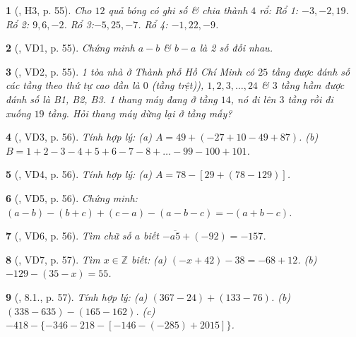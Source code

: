 \documentclass{article}
\newtheorem{baitoan}{}
\begin{document}
\begin{baitoan}[\cite{Binh_boi_duong_Toan_6_tap_1}, H3, p. 55]
	Cho $12$ quả bóng có ghi số \& chia thành $4$ rổ: Rổ 1: $-3,-2,19$. Rổ 2: $9,6,-2$. Rổ 3:$-5,25,-7$. Rổ 4: $-1,22,-9$.
\end{baitoan}

\begin{baitoan}[\cite{Binh_boi_duong_Toan_6_tap_1}, VD1, p. 55]
	Chứng minh $a - b$ \& $b - a$ là 2 số đối nhau.
\end{baitoan}

\begin{baitoan}[\cite{Binh_boi_duong_Toan_6_tap_1}, VD2, p. 55]
	1 tòa nhà ở Thành phố Hồ Chí Minh có $25$ tầng được đánh số các tầng theo thứ tự cao dần là $0$ (tầng trệt)), $1,2,3,\ldots,24$ \& $3$ tầng hầm được đánh số là B1, B2, B3. 1 thang máy đang ở tầng $14$, nó đi lên $3$ tầng rồi đi xuống $19$ tầng. Hỏi thang máy dừng lại ở tầng mấy?
\end{baitoan}

\begin{baitoan}[\cite{Binh_boi_duong_Toan_6_tap_1}, VD3, p. 56]
	Tính hợp lý: (a) $A = 49 + (-27 + 10 - 49 + 87)$. (b) $B = 1 + 2 - 3 - 4 + 5 + 6 - 7 - 8 + \ldots - 99 - 100 + 101$.
\end{baitoan}

\begin{baitoan}[\cite{Binh_boi_duong_Toan_6_tap_1}, VD4, p. 56]
	Tính hợp lý: (a) $A = 78 - [29 + (78 - 129)]$.
\end{baitoan}

\begin{baitoan}[\cite{Binh_boi_duong_Toan_6_tap_1}, VD5, p. 56]
	Chứng minh: $(a - b) - (b + c) + (c - a) - (a - b - c) = -(a + b - c)$.
\end{baitoan}

\begin{baitoan}[\cite{Binh_boi_duong_Toan_6_tap_1}, VD6, p. 56]
	Tìm chữ số $a$ biết $-\overline{a5} + (-92) = -157$.
\end{baitoan}

\begin{baitoan}[\cite{Binh_boi_duong_Toan_6_tap_1}, VD7, p. 57]
	Tìm $x\in\mathbb{Z}$ biết: (a) $(-x + 42) - 38 = -68 + 12$. (b) $-129 - (35 - x) = 55$.
\end{baitoan}

\begin{baitoan}[\cite{Binh_boi_duong_Toan_6_tap_1}, 8.1., p. 57]
	Tính hợp lý: (a) $(367 - 24) + (133 - 76)$. (b) $(338 - 635) - (165 - 162)$. (c) $-418 - \{-346 - 218 - [-146 - (-285) + 2015]\}$.
\end{baitoan}
\end{document}

